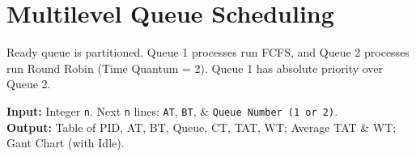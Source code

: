 \documentclass[10pt, a4paper]{article}
\begin{document}
\section{Multilevel Queue Scheduling}
Ready queue is partitioned. Queue 1 processes run FCFS, and Queue 2 processes run Round Robin (Time Quantum = 2). Queue 1 has absolute priority over Queue 2.

\begin{tcolorbox}[title=Input \& Output Format, iobox]
\textbf{Input:} Integer \texttt{n}. Next \texttt{n} lines: \texttt{AT}, \texttt{BT}, \& \texttt{Queue Number (1 or 2)}.\\
\textbf{Output:} Table of PID, AT, BT, Queue, CT, TAT, WT; Average TAT \& WT; Gant Chart (with Idle).
\end{tcolorbox}
\end{document}
